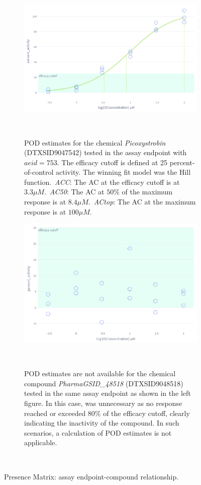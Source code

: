 \begin{figure}
    \centering
    \begin{subfigure}[b]{0.48\textwidth}
        \centering
        \includegraphics[width=\textwidth]{figures/POD.png}
        \caption{POD estimates for the chemical \emph{Picoxystrobin} (DTXSID9047542) tested in the assay endpoint with $aeid=753$. The efficacy cutoff is defined at 25 percent-of-control activity. The winning fit model was the Hill function.~\emph{ACC}: The AC at the efficacy cutoff is at $3.3 \mu M$.~\emph{AC50}: The AC at $50\%$ of the maximum response is at $8.4 \mu M$.~\emph{ACtop}: The AC at the maximum response is at $100 \mu M$.}
    ~\label{fig:active_and_pod}
    \end{subfigure}
    \hfill
    \begin{subfigure}[b]{0.48\textwidth}
        \centering
        \includegraphics[width=\textwidth]{figures/inactive_and_no_pod.png}
        \caption{POD estimates are not available for the chemical compound \emph{PharmaGSID\_48518} (DTXSID9048518) tested in the same assay endpoint as shown in the left figure. In this case, was unnecessary as no response reached or exceeded $80\%$ of the efficacy cutoff, clearly indicating the inactivity of the compound. In such scenarios, a calculation of POD estimates is not applicable.}
        ~\label{fig:inactive_and_no_pod}
    \end{subfigure}
    \caption{Presence Matrix: assay endpoint-compound relationship.}
    ~\label{fig:pod}
\end{figure}


